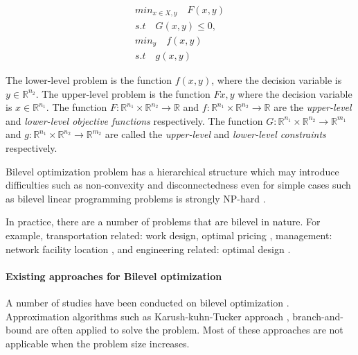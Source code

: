 \begin{subequations}
\label{eq:bilevel}
	\begin{align}
	min_{x \in X, y} 	\quad F(x, y) \\
	s.t 			\quad G(x, y) \leq 0, \\
	min_y			\quad f(x, y) \\
	s.t 			\quad g(x, y)
	\end{align}
\end{subequations}

The lower-level problem is the function $f(x, y)$, where the decision variable is $y \in \mathbb{R}^{n_2}$. The upper-level problem is the function $F{x, y}$ where the decision variable is $x \in \mathbb{R}^{n_1}$.
The function $F : \mathbb{R}^{n_1} \times  \mathbb{R}^{n_2} \to \mathbb{R}$ and $f : \mathbb{R}^{n_1} \times  \mathbb{R}^{n_2} \to \mathbb{R}$ are the \emph{upper-level} and \emph{lower-level objective functions} respectively. The function $G : \mathbb{R}^{n_1} \times  \mathbb{R}^{n_2} \to \mathbb{R}^{m_1}$ and $g : \mathbb{R}^{n_1} \times  \mathbb{R}^{n_2} \to \mathbb{R}^{m_2}$ are called the \emph{upper-level} and \emph{lower-level constraints} respectively. 

Bilevel optimization problem has a hierarchical structure which may introduce difficulties such as non-convexity and disconnectedness even for simple cases such as bilevel linear programming problems is strongly NP-hard \cite{Sinha:2013tn}. 

In practice, there are a number of problems that are bilevel in nature. For example, transportation related: work design, optimal pricing \cite{Brotcorne:2001je, Constantin:1995hu}, management: network facility location \cite{Sun:2008gq},  and engineering related: optimal design \cite{KirjnerNeto:1998ef}. 




\paragraph{Existing approaches for Bilevel optimization}

A number of studies have been conducted on bilevel optimization \cite{Colson:2007bu,Dempe:2006jc}. Approximation algorithms such as Karush-kuhn-Tucker approach \cite{Bianco:2009ej, Herskovits:2000be}, branch-and-bound \cite{Bard:1982gsa} are often applied to solve the problem. Most of these approaches are not applicable when the problem size increases.

